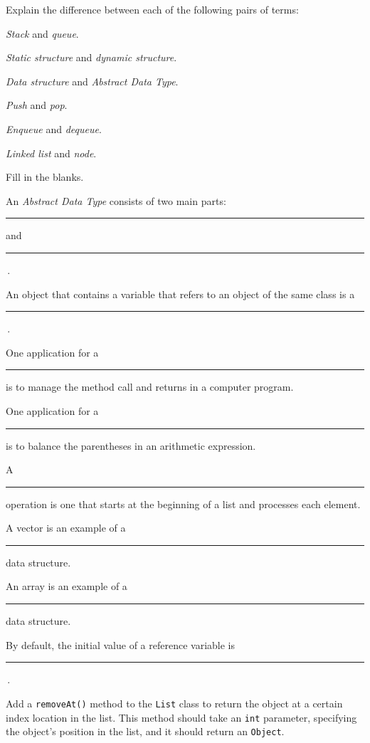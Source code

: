 \begin{EXRtwo}

\item  Explain the difference between each of the following pairs of terms:
\begin{EXRtwoLL}
\begin{multicols}{2}
\item  {\it Stack} and {\it queue}.
\item  {\it Static structure} and {\it dynamic structure}.
\item  {\it Data structure} and {\it Abstract Data Type}.
\item  {\it Push} and {\it pop}.
\item  {\it Enqueue} and {\it dequeue}.
\item  {\it Linked list} and {\it node}.
\end{multicols}
\end{EXRtwoLL}

\item  Fill in the blanks.
\begin{EXRtwoLL}\baselineskip=12.5pt
\item  An {\it Abstract Data Type} consists of two
main parts: \rule{40pt}{0.5pt} and \rule{40pt}{0.5pt}\,.
\item  An object that contains a variable that refers to an object of
the same class is a \rule{40pt}{0.5pt}\,.
\item  One application for a \rule{40pt}{0.5pt} is to manage the method
call and returns in a computer program.
\item  One application for a \rule{40pt}{0.5pt} is to balance the parentheses
in an arithmetic expression.
\item  A \rule{40pt}{0.5pt} operation is one that starts at the beginning
of a list and processes each element.
\item  A vector is an example of a \rule{40pt}{0.5pt} data structure.
\item  An array is an example of a \rule{40pt}{0.5pt} data structure.
\item  By default, the initial value of a reference variable
is \rule{40pt}{0.5pt}\,.
\end{EXRtwoLL}\baselineskip=11pt

\item  Add a {\tt removeAt()} method to the {\tt List} class to
return the object at a certain index location in the list.  This method
should take an {\tt int} parameter, specifying the object's position
in the list, and it should return an {\tt Object}.


\end{EXRtwo}
